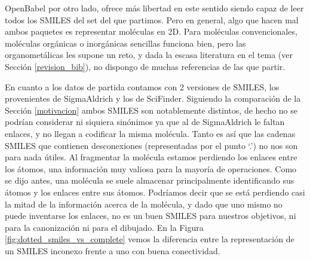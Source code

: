 OpenBabel por otro lado, ofrece más libertad en este sentido siendo capaz de leer todos los SMILES del set del que partimos. Pero en general, algo que hacen mal ambos paquetes es representar moléculas en 2D. Para moléculas convencionales, moléculas orgánicas o inorgánicas sencillas funciona bien, pero las organometálicas les supone un reto, y dada la escasa literatura en el tema (ver Sección \ref{revision_bib}), no dispongo de muchas referencias de las que partir.


En cuanto a los datos de partida contamos con 2 versiones de SMILES, los provenientes de SigmaAldrich y los de SciFinder. Siguiendo la comparación de la Sección \ref{motivacion} ambos SMILES son notablemente distintos, de hecho no se podrían considerar ni siquiera sinónimos ya que al de SigmaAldrich le faltan enlaces, y no llegan a codificar la misma molécula. Tanto es así que las cadenas SMILES que contienen desconexiones (representadas por el punto `.') no nos son para nada útiles. Al fragmentar la molécula estamos perdiendo los enlaces entre los átomos, una información muy valiosa para la mayoría de operaciones. Como se dijo antes, una molécula se suele almacenar principalmente identificando sus átomos y los enlaces entre sus átomos. Podríamos decir que se está perdiendo casi la mitad de la información acerca de la molécula, y dado que uno mismo no puede inventarse los enlaces, no es un buen SMILES para nuestros objetivos, ni para la canonización ni para el dibujado. En la Figura \ref{fig:dotted_smiles_vs_complete} vemos la diferencia entre la representación de un SMILES inconexo frente a uno con buena conectividad.


